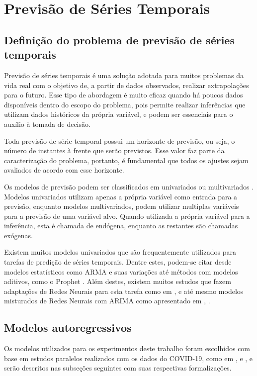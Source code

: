 \chapter{Previsão de Séries Temporais}
\label{chap:02}

\section{Definição do problema de previsão de séries temporais}
Previsão de séries temporais é uma solução adotada para muitos problemas da vida real com o objetivo de, a partir de dados observados, realizar extrapolações para o futuro. Esse tipo de abordagem é muito eficaz quando há poucos dados disponíveis dentro do escopo do problema, pois permite realizar inferências que utilizam dados históricos da própria variável, e podem ser essenciais para o auxílio à tomada de decisão.

Toda previsão de série temporal possui um horizonte de previsão, ou seja, o número de instantes à frente que serão previstos. Esse valor faz parte da caracterização do problema, portanto, é fundamental que todos os ajustes sejam avaliados de acordo com esse horizonte.

Os modelos de previsão podem ser classificados em univariados ou multivariados \cite{box&jenkins}. Modelos univariados utilizam apenas a própria variável como entrada para a previsão, enquanto modelos multivariados, podem utilizar multiplas variáveis para a previsão de uma variável alvo. Quando utilizada a própria variável para a inferência, esta é chamada de endógena, enquanto as restantes são chamadas exógenas.

Existem muitos modelos univariados que são frequentemente utilizados para tarefas de predição de séries temporais. Dentre estes, podem-se citar desde modelos estatísticos como ARMA \cite{box&jenkins} e suas variações \cite{ALZAHRANI2020914} até métodos com modelos aditivos, como o Prophet \cite{fbprophet}. Além destes, existem muitos estudos que fazem adaptações de Redes Neurais para esta tarefa como em \citeauthor{ZHANG2005501}, \citeyear{ZHANG2005501} \cite{ZHANG2005501} e até mesmo modelos misturados de Redes Neurais com ARIMA como apresentado em \citeauthor{akaike}, \citeyear{akaike} \cite{akaike}.

\section{Modelos autoregressivos}
Os modelos utilizados para os experimentos deste trabalho foram escolhidos com base em estudos paralelos realizados com os dados do COVID-19, como em \citeauthor{RIBEIRO2020109853}, \citeyear{RIBEIRO2020109853} \cite{RIBEIRO2020109853} e \citet{WANG2020110058}, e serão descritos nas subseções seguintes com suas respectivas formalizações.
